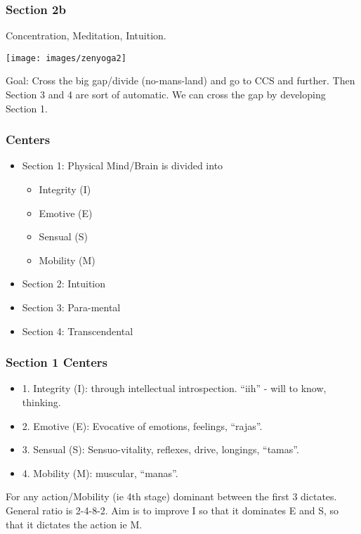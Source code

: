 \begin{frame}[fragile]
\frametitle{Section 2b}
Concentration, Meditation, Intuition.

 \begin{center}
\texttt{[image: images/zenyoga2]}
\end{center}

Goal: Cross the big gap/divide (no-mans-land) and go to CCS and further. Then Section 3 and 4 are sort of automatic.
We can cross the gap by developing Section 1.

\end{frame}

\begin{frame}[fragile]
\frametitle{Centers}

\begin{itemize}
\item Section 1: Physical Mind/Brain is divided into
\begin{itemize}
\item Integrity (I)
\item Emotive (E)
\item Sensual (S)
\item Mobility (M)
\end{itemize}
\item Section 2: Intuition
\item Section 3: Para-mental
\item Section 4: Transcendental
\end{itemize}

\end{frame}


\begin{frame}[fragile]
\frametitle{Section 1 Centers}

\begin{itemize}
\item 1. Integrity (I): through intellectual introspection. ``iih'' - will to know, thinking.
\item 2. Emotive (E): Evocative of emotions, feelings, ``rajas''.
\item 3. Sensual (S): Sensuo-vitality, reflexes, drive, longings, ``tamas''.
\item 4. Mobility (M): muscular, ``manas''.
\end{itemize}

For any action/Mobility (ie 4th stage) dominant between the first 3 dictates. General ratio is 2-4-8-2. Aim is to improve I so that it dominates E and S, so that it dictates the action ie M. 

\end{frame}



